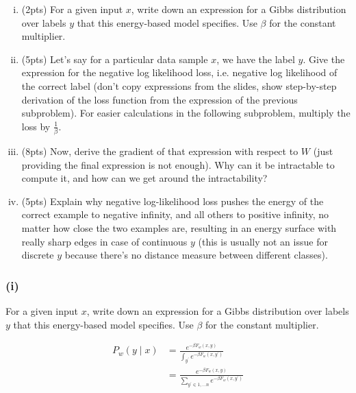 \begin{enumerate}[(i)]
    \item (2pts) For a given input $x$, write down an expression for a Gibbs distribution over labels $y$ that this energy-based model specifies. Use $\beta$ for the constant multiplier.

    \item (5pts) Let's say for a particular data sample $x$, we have the label $y$. Give the expression for the negative log likelihood loss, i.e. negative log likelihood of the correct label (don't copy expressions from the slides, show step-by-step derivation of the loss function from the expression of the previous subproblem). For easier calculations in the following subproblem, multiply the loss by $\frac{1}{\beta}$.

    \item (8pts) Now, derive the gradient of that expression with respect to $W$ (just providing the final expression is not enough). Why can it be intractable to compute it, and how can we get around the intractability?

    \item (5pts) Explain why negative log-likelihood loss pushes the energy of the correct example to negative infinity, and all others to positive infinity, no matter how close the two examples are, resulting in an energy surface with really sharp edges in case of continuous $y$ (this is usually not an issue for discrete $y$ because there's no distance measure between different classes).

\end{enumerate}

\subsubsection*{(i)}
For a given input $x$, write down an expression for a Gibbs distribution over labels $y$ that this energy-based model specifies. Use $\beta$ for the constant multiplier.


\begin{align}
    P_{w}(y \mid x)
     & =\frac{e^{-\beta F_{w}(x, y)}}{\int_{y^{\prime}} e^{-\beta F_{w}\left(x, y^{\prime}\right)}} \\
     & =\frac{e^{-\beta F_{w}(x, y)}}
    {\sum_{y^{\prime} \in {1,...n}} e^{-\beta F_{w}\left(x, y^{\prime}\right)}}
\end{align}\label{eq:p_y_given_x}

